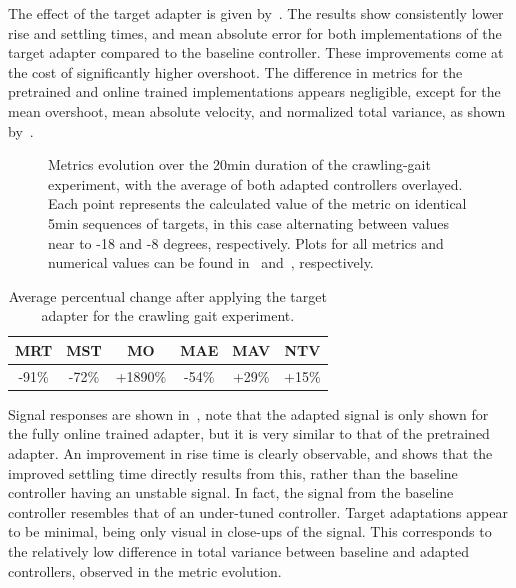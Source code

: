The effect of the target adapter is given by~.
The results show consistently lower rise and settling times, and mean absolute error for both implementations of the target adapter compared to the baseline controller.
These improvements come at the cost of significantly higher overshoot.
The difference in metrics for the pretrained and online trained implementations appears negligible, except for the mean overshoot, mean absolute velocity, and normalized total variance, as shown by~.

\begin{figure}
    \centering
    
    \vspace*{-1em}
    \caption{Metrics evolution over the 20\si{\minute} duration of the crawling-gait experiment, with the average of both adapted controllers overlayed. Each point represents the calculated value of the metric on identical 5\si{\minute} sequences of targets, in this case alternating between values near to -18 and -8 degrees, respectively. Plots for all metrics and numerical values can be found in~ and~, respectively.}
    \label{fig:crawling-metrics}
\end{figure}

\begin{table}
    \centering
    \caption{Average percentual change after applying the target adapter for the crawling gait experiment.}
    \label{tab:crawling-gait-percent}
    \begin{tabular}{cccccc}
        \toprule
        MRT              & MST              & MO                 & MAE              & MAV              & NTV              \\
        \midrule
        -91\si{\percent} & -72\si{\percent} & +1890\si{\percent} & -54\si{\percent} & +29\si{\percent}  & +15\si{\percent}\\
        \bottomrule
    \end{tabular}
\end{table}

Signal responses are shown in~, note that the adapted signal is only shown for the fully online trained adapter, but it is very similar to that of the pretrained adapter.
An improvement in rise time is clearly observable, and shows that the improved settling time directly results from this, rather than the baseline controller having an unstable signal.
In fact, the signal from the baseline controller resembles that of an under-tuned controller.
Target adaptations appear to be minimal, being only visual in close-ups of the signal.
This corresponds to the relatively low difference in total variance between baseline and adapted controllers, observed in the metric evolution.

